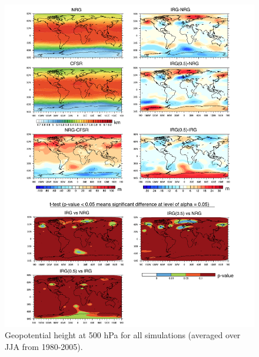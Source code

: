 \begin{figure}
\begin{center}
\includegraphics[width=6in]{supplement/geopotential_height_500hPa_JJA.pdf}
\caption{Geopotential height at 500 hPa for all simulations (averaged over JJA from 1980-2005).}
\end{center}
\end{figure}

